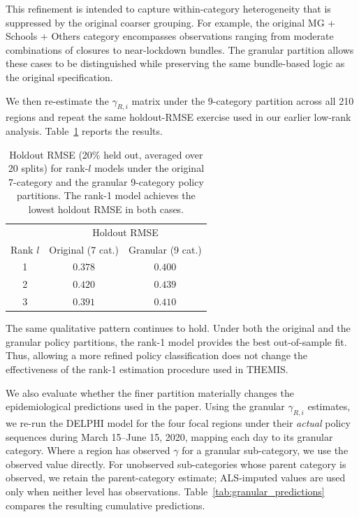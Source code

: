 \documentclass[letterpaper,twoside,11pt]{reviewresponse}
\begin{document}
This refinement is intended to capture within-category heterogeneity that is suppressed by the original coarser grouping. For example, the original MG + Schools + Others category encompasses observations ranging from moderate combinations of closures to near-lockdown bundles. The granular partition allows these cases to be distinguished while preserving the same bundle-based logic as the original specification.

We then re-estimate the $\gamma_{R,i}$ matrix under the 9-category partition across all 210 regions and repeat the same holdout-RMSE exercise used in our earlier low-rank analysis. Table~\ref{tab:granular_rmse} reports the results.

\begin{table}[htbp!]
	\centering
	\begin{tabular}{|c|cc|}
		\hline
		& \multicolumn{2}{c|}{Holdout RMSE} \\
		Rank $l$ & Original (7 cat.) & Granular (9 cat.) \\\hline
		1 & $0.378$ & $0.400$ \\
		2 & $0.420$ & $0.439$ \\
		3 & $0.391$ & $0.410$ \\\hline
	\end{tabular}
	\caption{Holdout RMSE (20\% held out, averaged over 20 splits) for rank-$l$ models under the original 7-category and the granular 9-category policy partitions. The rank-1 model achieves the lowest holdout RMSE in both cases.}
	\label{tab:granular_rmse}
\end{table}

The same qualitative pattern continues to hold. Under both the original and the granular policy partitions, the rank-1 model provides the best out-of-sample fit. Thus, allowing a more refined policy classification does not change the effectiveness of the rank-1 estimation procedure used in THEMIS.

We also evaluate whether the finer partition materially changes the epidemiological predictions used in the paper. Using the granular $\gamma_{R,i}$ estimates, we re-run the DELPHI model for the four focal regions under their \emph{actual} policy sequences during March 15--June 15, 2020, mapping each day to its granular category. Where a region has observed $\gamma$ for a granular sub-category, we use the observed value directly. For unobserved sub-categories whose parent category is observed, we retain the parent-category estimate; ALS-imputed values are used only when neither level has observations. Table~\ref{tab:granular_predictions} compares the resulting cumulative predictions.
\end{document}

